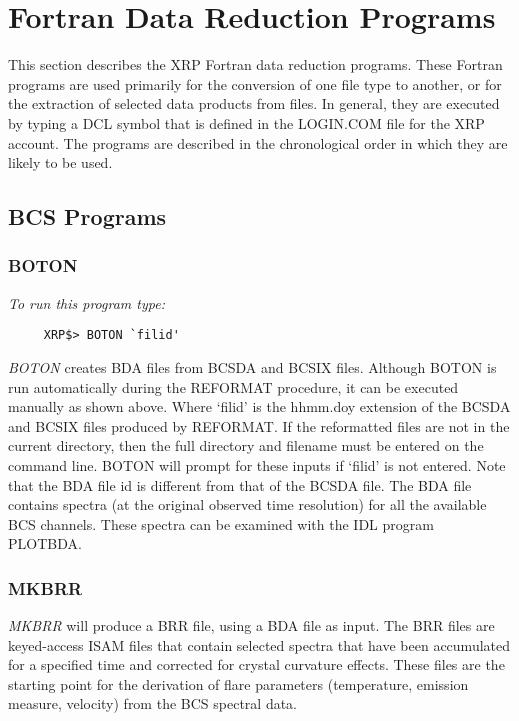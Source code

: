 \section{Fortran Data Reduction Programs}

This section describes the XRP Fortran data reduction programs.
These Fortran programs are used primarily for the conversion of one file type
to another, or for  the extraction of selected data products from files. In
general, they are executed by typing a DCL symbol that is defined in the
LOGIN.COM file for the XRP account. The programs are described in the
chronological order in which they are likely to be used.

\subsection{BCS Programs}

\subsubsection{BOTON}

{\em To run this program type:}
\begin{verbatim}
     XRP$> BOTON `filid'
\end{verbatim}
{\em BOTON} creates BDA files from BCSDA and BCSIX files. Although
   BOTON is run automatically during the REFORMAT procedure, it can be
   executed manually as shown above.
   Where `filid' is the hhmm.doy extension of the BCSDA and BCSIX files
   produced by REFORMAT. If the reformatted files are not in the current
   directory, then the full directory and filename must be entered on the command
   line. BOTON will prompt for these inputs if `filid' is not entered. Note that
   the BDA file id is different from that of the BCSDA file. The BDA file contains
   spectra (at the original observed time resolution) for all the available BCS
   channels. These spectra can be examined with the IDL program PLOTBDA.

\subsubsection{MKBRR}

  {\em MKBRR} will produce a BRR file, using a BDA file as input.
   The BRR files are keyed-access ISAM files that contain selected spectra that have been
   accumulated  for a specified time and corrected for crystal curvature effects.
   These files are the starting point for the derivation of flare parameters
   (temperature, emission measure, velocity) from the BCS spectral data.

